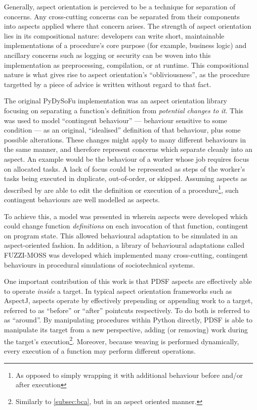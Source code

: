 Generally, aspect orientation is percieved to be a technique for separation of
concerns. Any cross-cutting concerns can be separated from their components into
aspects applied where that concern arises. The strength of aspect orientation
lies in its compositional nature: developers can write short, maintainable
implementations of a procedure's core purpose (for example, business logic) and
ancillary concerns such as logging or security can be woven into this
implementation as preprocessing, compilation, or at runtime. This compositional
nature is what gives rise to aspect orientation's ``obliviousness'', as the
procedure targetted by a piece of advice is written without regard to that fact.

The original PyDySoFu implementation was an aspect orientation library focusing
on separating a function's definition from \emph{potential changes to it}. This
was used to model ``contingent behaviour'' --- behaviour sensitive to some
condition --- as an original, ``idealised'' definition of that behaviour, plus
some possible alterations. These changes might apply to many different
behaviours in the same manner, and therefore represent concerns which separate
cleanly into an aspect. An example would be the behaviour of a worker whose job
requires focus on allocated tasks. A lack of focus could be represented as steps
of the worker's tasks being executed in duplicate, out-of-order, or skipped.
Assuming aspects as described by \citeauthor{kiczales1997aspect} are able to
edit the definition or execution of a procedure\footnote{As opposed to simply
wrapping it with additional behaviour before and/or after execution}, such
contingent behaviours are well modelled as aspects.

To achieve this, a model was presented in \cite{wallis2018caise} wherein aspects
were developed which could change function \emph{definitions} on each invocation
of that function, contingent on program state. This allowed behavioural
adaptation to be simulated in an aspect-oriented fashion. In addition, a library
of behavioural adaptations called FUZZI-MOSS was developed
which implemented many cross-cutting, contingent behaviours in procedural
simulations of sociotechnical systems.

One important contribution of this work is that PDSF aspects are effectively
able to operate \emph{inside} a target. In typical aspect orientation frameworks
such as AspectJ\cite{aspectj_intro}, aspects operate by effectively prepending
or appending work to a target, referred to as ``before'' or ``after'' pointcuts
respectively. To do both is referred to as ``around''. By manipulating
procedures within Python directly, PDSF is able to manipulate its target from a
new perspective, adding (or removing) work during the target's
execution\footnote{Similarly to \cref{subsec:bca}, but in an aspect oriented
manner.}. Moreover, because weaving is performed dynamically, every execution of
a function may perform different operations.

